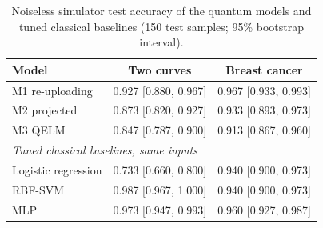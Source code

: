 \begin{table}[t]
\centering
\caption{Noiseless simulator test accuracy of the quantum models and tuned classical baselines (150 test samples; 95\% bootstrap interval).}
\label{tab:sim}
\footnotesize
\setlength{\tabcolsep}{3.5pt}
\begin{tabular}{lcc}
\toprule
Model & Two curves & Breast cancer \\
\midrule
M1 re-uploading & 0.927 [0.880, 0.967] & 0.967 [0.933, 0.993] \\
M2 projected & 0.873 [0.820, 0.927] & 0.933 [0.893, 0.973] \\
M3 QELM & 0.847 [0.787, 0.900] & 0.913 [0.867, 0.960] \\
\midrule\multicolumn{3}{l}{\emph{Tuned classical baselines, same inputs}} \\
Logistic regression & 0.733 [0.660, 0.800] & 0.940 [0.900, 0.973] \\
RBF-SVM & 0.987 [0.967, 1.000] & 0.940 [0.900, 0.973] \\
MLP & 0.973 [0.947, 0.993] & 0.960 [0.927, 0.987] \\
\bottomrule
\end{tabular}
\end{table}
